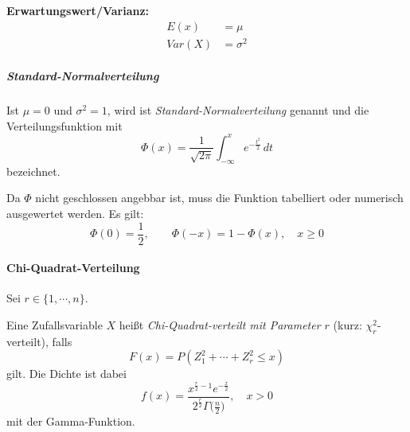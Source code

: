 \documentclass[a4paper, 11pt, accentcolor = tud3b]{tudreport}
\newcommand{\Var}{\ensuremath{\textit{Var}}}
\begin{document}
                        \textbf{Erwartungswert/Varianz:}
                        \begin{align*}
                        	E(x)    & = \mu      \\
                        	\Var(X) & = \sigma^2
                        \end{align*}
                        
                        \subparagraph{Standard-Normalverteilung}
	                        \label{sec:snd}
                        
	                        Ist \( \mu = 0 \) und \( \sigma^2 = 1 \), wird ist \textit{Standard-Normalverteilung} genannt und die Verteilungsfunktion mit
	                        \begin{equation*}
		                        \Phi(x) = \frac{1}{\sqrt{2\pi}} \int_{-\infty}^{x} \! e^{-\frac{t^2}{2}} \, dt
	                        \end{equation*}
	                        bezeichnet.
	                        
	                        Da \( \Phi \) nicht geschlossen angebbar ist, muss die Funktion tabelliert oder numerisch ausgewertet werden. Es gilt:
	                        \begin{equation*}
		                        \Phi(0) = \frac{1}{2}, \qquad \Phi(-x) = 1 - \Phi(x), \quad x \geq 0
	                        \end{equation*}

                    \paragraph{Chi-Quadrat-Verteilung}
                        Sei \( r \in \{ 1, \cdots, n \} \).
                        
                        Eine Zufallsvariable \(X\) heißt \textit{Chi-Quadrat-verteilt mit Parameter \(r\)} (kurz: \( \chi_r^2 \)-verteilt), falls
                        \begin{equation*}
	                        F(x) = P(Z_1^2 + \cdots + Z_r^2 \leq x)
                        \end{equation*}
                        gilt. Die Dichte ist dabei
                        \begin{equation*}
	                        f(x) = \frac{x^{\frac{r}{2} - 1} e^{-\frac{x}{2}}}{2^\frac{r}{2} \Gamma\big(\frac{n}{2}\big)}, \quad x > 0
                        \end{equation*}
                        mit der Gamma-Funktion.
\end{document}
